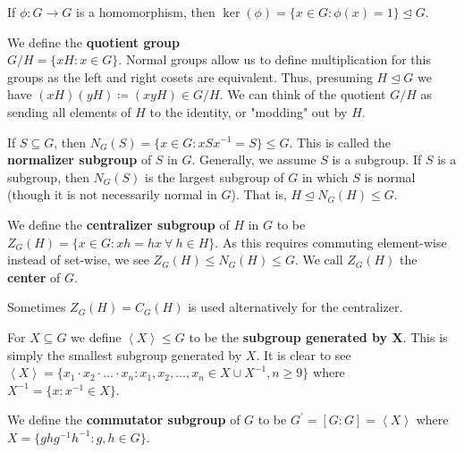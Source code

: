 \begin{remark}
	If  $ \phi: G \to G$ is a homomorphism, then $\ker \left( \phi \right) = \{x \in G : \phi \left( x \right) = 1\} \trianglelefteq G$.
\end{remark}
\begin{definition}
	We define the \textbf{quotient group} \\$G / H = \{xH : x \in G\} $. Normal groups allow us to define multiplication for this groups as the left and right cosets are equivalent. Thus, presuming $H \trianglelefteq G$ we have $\left( xH \right) \left( yH \right) \coloneqq \left( xyH \right) \in G / H$. We can think of the quotient $G / H$ as sending all elements of $H$ to the identity, or "modding" out by $H$.
\end{definition}
\begin{definition}[Normalizer]
	If $S \subseteq G$, then $N_{G}\left( S \right) = \{x \in G : xSx^{-1} = S\} \le G $. This is called the \textbf{normalizer subgroup} of $S$ in $G$. Generally, we assume $S$ is a subgroup. If $S$ is a subgroup, then $N_{G}\left( S \right) $ is the largest subgroup of $G$ in which $S$ is normal (though it is not necessarily normal in $G$). That is,  $H \trianglelefteq N_{G}\left( H \right) \le G$.
\end{definition}
\begin{definition}[Centralizer]
	We define the \textbf{centralizer subgroup} of $H$ in $G$ to be $Z_{G}\left( H \right) = \{x \in G: xh = hx \ \forall \ h \in H\}$. As this requires commuting element-wise instead of set-wise, we see $Z_{G}\left( H \right) \le N_{G}\left( H \right) \le G$. We call $Z_{G}\left( H \right) $ the \textbf{center} of $G$.
\end{definition}
\begin{notation}
	Sometimes $Z_{G}\left( H \right) = C_{G}\left( H \right) $ is used alternatively for the centralizer.
\end{notation}
\begin{definition}
For $X \subseteq G$ we define $\left< X \right> \le G$ to be the \textbf{subgroup generated by X}. This is simply the smallest subgroup generated by $X$. It is clear to see $\left<X \right> = \{x_1\cdot x_2\cdot \ldots \cdot x_{n} : x_1, x_2, \ldots, x_{n} \in X \cup X^{-1}, n\ge 9\} $ where $X^{-1} = \{x: x^{-1} \in X\} $.
\end{definition}
\begin{definition}[Commutator]
	We define the \textbf{commutator subgroup} of $G$ to be $G^{\prime} = \left[ G : G \right] = \left<X \right> $ where $X = \{ghg^{-1}h^{-1} : g, h \in G\} $.
\end{definition}
